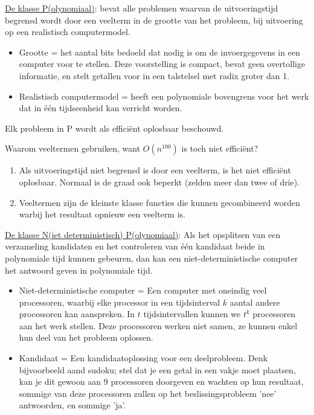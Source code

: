 \documentclass{report}
\begin{document}
\underline{De klasse P(olynomiaal)}: bevat alle problemen waarvan de uitvoeringstijd begrensd wordt door een veelterm in de grootte van het probleem, bij uitvoering op een realistisch computermodel.
\begin{itemize}
	\item Grootte = het aantal bits bedoeld dat nodig is om de invoergegevens in een computer voor te stellen. Deze voorstelling is compact, bevat geen overtollige informatie, en stelt getallen voor in een talstelsel met radix groter dan 1.
	\item Realistisch computermodel = heeft een polynomiale bovengrens voor het werk dat in één tijdseenheid kan verricht worden. 
\end{itemize}

Elk probleem in P wordt als efficiënt oplosbaar beschouwd.

Waarom veeltermen gebruiken, want $O(n^{100})$ is toch niet efficiënt?
\begin{enumerate}
	\item Als uitvoeringstijd niet begrensd is door een veelterm, is het niet efficiënt oplosbaar. Normaal is de graad ook beperkt (zelden meer dan twee of drie).
	\item Veeltermen zijn de kleinste klasse functies die kunnen gecombineerd worden warbij het resultaat opnieuw een veelterm is. 
\end{enumerate}

\underline{De klasse N(iet deterministisch) P(olynomiaal)}: Als het opsplitsen van een verzameling kandidaten en het controleren van één kandidaat beide in polynomiale tijd kunnen gebeuren, dan kan een niet-deterministische computer het antwoord geven in polynomiale tijd.
\begin{itemize}
	\item Niet-deterministische computer = Een computer met oneindig veel processoren, waarbij elke processor in een tijdsinterval $k$ aantal andere processoren kan aanspreken. In $t$ tijdsintervallen kunnen we $t^k$ processoren aan het werk stellen. Deze processoren werken niet samen, ze kunnen enkel hun deel van het probleem oplossen.
	\item Kandidaat = Een kandidaatoplossing voor een deelprobleem. Denk bijvoorbeeld aand sudoku; stel dat je een getal in een vakje moet plaatsen, kan je dit gewoon aan 9 processoren doorgeven en wachten op hun resultaat, sommige van deze processoren zullen op het beslissingsprobleem 'nee' antwoorden, en sommige 'ja'.
\end{itemize}
\end{document}
